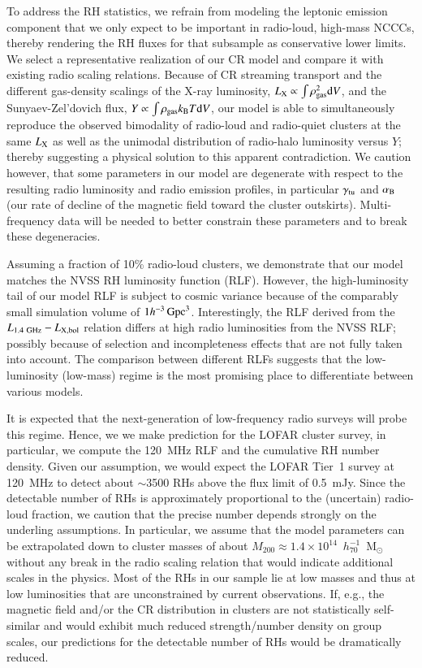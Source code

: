 \documentclass[useAMS,usenatbib]{mn2e}
\newcommand{\dd}{\mathrm{d}}
\begin{document}
To address the RH statistics, we refrain from modeling the leptonic emission
component that we only expect to be important in radio-loud, high-mass NCCCs,
thereby rendering the RH fluxes for that subsample as conservative lower
limits. We select a representative realization of our CR model and compare it
with existing radio scaling relations.  Because of CR streaming transport and
the different gas-density scalings of the X-ray luminosity,
$L_{\rmn{X}}\propto\int \rho_\rmn{gas}^2 \dd V$, and the Sunyaev-Zel'dovich
flux, $Y\propto\int \rho_{\rmn{gas}} k_{\rmn{B}} T \dd V$, our model is able to
simultaneously reproduce the observed bimodality of radio-loud and radio-quiet
clusters at the same $L_{{\mathrm{X}}}$ as well as the unimodal distribution of
radio-halo luminosity versus $Y$; thereby suggesting a physical solution to this
apparent contradiction. We caution however, that some parameters in our model
are degenerate with respect to the resulting radio luminosity and radio emission
profiles, in particular $\gamma_{{\mathrm{tu}}}$ and $ \alpha_{{\mathrm{B}}}$ (our rate of decline
of the magnetic field toward the cluster outskirts). Multi-frequency data will
be needed to better constrain these parameters and to break these degeneracies.

Assuming a fraction of 10\% radio-loud clusters, we demonstrate that our model
matches the NVSS RH luminosity function (RLF). However, the
high-luminosity tail of our model RLF is subject to cosmic variance because of
the comparably small simulation volume of $1
h^{-3}\,{\mathrm{Gpc}}^3$. Interestingly, the RLF derived from the
$L_{1.4~{\mathrm{GHz}}}-L_{{\mathrm{X,bol}}}$ relation differs at high radio luminosities
from the NVSS RLF; possibly because of selection and incompleteness effects that
are not fully taken into account. The comparison between different RLFs suggests
that the low-luminosity (low-mass) regime is the most promising place to
differentiate between various models.

It is expected that the next-generation of low-frequency radio surveys will
probe this regime. Hence, we we make prediction for the LOFAR cluster survey, in
particular, we compute the 120~MHz RLF and the cumulative RH number
density. Given our assumption, we would expect the LOFAR Tier~1 survey at
120~MHz to detect about $\sim$3500 RHs above the flux limit of 0.5~mJy. Since
the detectable number of RHs is approximately proportional to the (uncertain)
radio-loud fraction, we caution that the precise number depends strongly on the
underling assumptions. In particular, we assume that the model parameters can be
extrapolated down to cluster masses of about
$M_{200}\approx1.4\times10^{14}$~$h_{70}^{-1}$~M$_{\odot}$ without any break in
the radio scaling relation that would indicate additional scales in the physics.
Most of the RHs in our sample lie at low masses and thus at low luminosities
that are unconstrained by current observations. If, e.g., the magnetic field
and/or the CR distribution in clusters are not statistically self-similar and
would exhibit much reduced strength/number density on group scales, our
predictions for the detectable number of RHs would be dramatically reduced.
\end{document}
